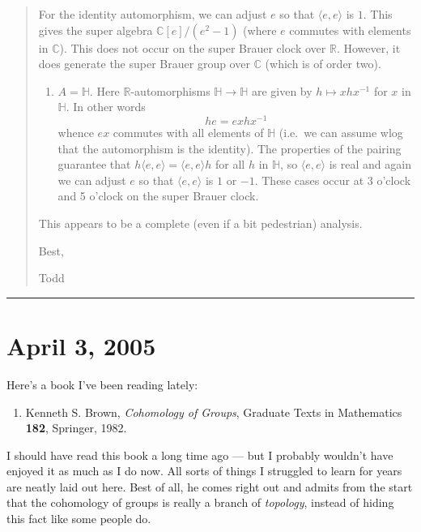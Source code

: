 \documentclass{article}
\def\tightlist{}
\begin{document}
\begin{quote}
For the identity automorphism, we can adjust \(e\) so that
\(\langle e, e\rangle\) is \(1\). This gives the super algebra
\(\mathbb{C}[e]/(e^2 - 1)\) (where \(e\) commutes with elements in
\(\mathbb{C}\)). This does not occur on the super Brauer clock over
\(\mathbb{R}\). However, it does generate the super Brauer group over
\(\mathbb{C}\) (which is of order two).

\begin{enumerate}
\def\labelenumi{\arabic{enumi}.}
\setcounter{enumi}{2}
\tightlist
\item
  \(A = \mathbb{H}\). Here \(\mathbb{R}\)-automorphisms
  \(\mathbb{H} \to \mathbb{H}\) are given by \(h \mapsto xhx^{-1}\) for
  \(x\) in \(\mathbb{H}\). In other words \[he = exhx^{-1}\] whence
  \(ex\) commutes with all elements of \(\mathbb{H}\) (i.e.~we can
  assume wlog that the automorphism is the identity). The properties of
  the pairing guarantee that
  \(h\langle e, e\rangle = \langle e, e\rangle h\) for all \(h\) in
  \(\mathbb{H}\), so \(\langle e, e\rangle\) is real and again we can
  adjust \(e\) so that \(\langle e, e\rangle\) is \(1\) or \(-1\). These
  cases occur at 3 o'clock and 5 o'clock on the super Brauer clock.
\end{enumerate}

This appears to be a complete (even if a bit pedestrian) analysis.

Best,

Todd
\end{quote}

\begin{center}\rule{0.5\linewidth}{0.5pt}\end{center}



\hypertarget{week213}{%
\section{April 3, 2005}\label{week213}}

Here's a book I've been reading lately:

\begin{enumerate}
\def\labelenumi{\arabic{enumi})}
\tightlist
\item
  Kenneth S. Brown, \emph{Cohomology of Groups}, Graduate Texts in
  Mathematics \textbf{182}, Springer, 1982.
\end{enumerate}

I should have read this book a long time ago --- but I probably wouldn't
have enjoyed it as much as I do now. All sorts of things I struggled to
learn for years are neatly laid out here. Best of all, he comes right
out and admits from the start that the cohomology of groups is really a
branch of \emph{topology}, instead of hiding this fact like some people
do.
\end{document}

